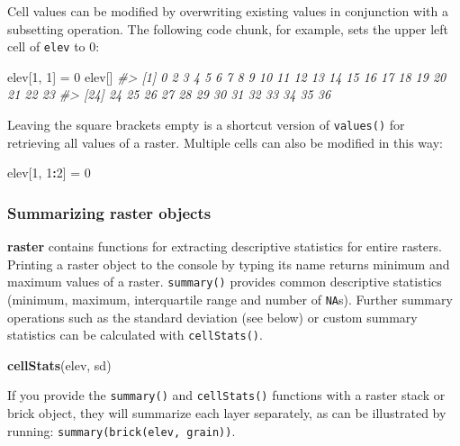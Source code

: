 \documentclass[]{krantz}
\newenvironment{Shaded}{\begin{snugshade}}{\end{snugshade}}
\newcommand{\CommentTok}[1]{\textcolor[rgb]{0.37,0.37,0.37}{\textit{#1}}}
\newcommand{\DecValTok}[1]{\textcolor[rgb]{0.06,0.06,0.06}{#1}}
\newcommand{\KeywordTok}[1]{\textcolor[rgb]{0.27,0.27,0.27}{\textbf{#1}}}
\newcommand{\NormalTok}[1]{#1}
\newcommand{\OperatorTok}[1]{\textcolor[rgb]{0.43,0.43,0.43}{\textbf{#1}}}
\newcommand{\StringTok}[1]{\textcolor[rgb]{0.5,0.5,0.5}{#1}}
\let\BeginKnitrBlock\begin \let\EndKnitrBlock\end
\begin{document}
Cell values can be modified by overwriting existing values in conjunction with a subsetting operation.
The following code chunk, for example, sets the upper left cell of \texttt{elev} to 0:

\begin{Shaded}
\begin{Highlighting}[]
\NormalTok{elev[}\DecValTok{1}\NormalTok{, }\DecValTok{1}\NormalTok{] =}\StringTok{ }\DecValTok{0}
\NormalTok{elev[]}
\CommentTok{#>  [1]  0  2  3  4  5  6  7  8  9 10 11 12 13 14 15 16 17 18 19 20 21 22 23}
\CommentTok{#> [24] 24 25 26 27 28 29 30 31 32 33 34 35 36}
\end{Highlighting}
\end{Shaded}

Leaving the square brackets empty is a shortcut version of \texttt{values()} for retrieving all values of a raster.
Multiple cells can also be modified in this way:

\begin{Shaded}
\begin{Highlighting}[]
\NormalTok{elev[}\DecValTok{1}\NormalTok{, }\DecValTok{1}\OperatorTok{:}\DecValTok{2}\NormalTok{] =}\StringTok{ }\DecValTok{0}
\end{Highlighting}
\end{Shaded}

\hypertarget{summarizing-raster-objects}{%
\subsubsection{Summarizing raster objects}\label{summarizing-raster-objects}}

\textbf{raster} contains functions for extracting descriptive statistics for entire rasters.
Printing a raster object to the console by typing its name returns minimum and maximum values of a raster.
\texttt{summary()} provides common descriptive statistics (minimum, maximum, interquartile range and number of \texttt{NA}s).
Further summary operations such as the standard deviation (see below) or custom summary statistics can be calculated with \texttt{cellStats()}.

\begin{Shaded}
\begin{Highlighting}[]
\KeywordTok{cellStats}\NormalTok{(elev, sd)}
\end{Highlighting}
\end{Shaded}

\BeginKnitrBlock{rmdnote}
If you provide the \texttt{summary()} and \texttt{cellStats()} functions with a raster stack or brick object, they will summarize each layer separately, as can be illustrated by running: \texttt{summary(brick(elev,\ grain))}.
\EndKnitrBlock{rmdnote}
\end{document}
